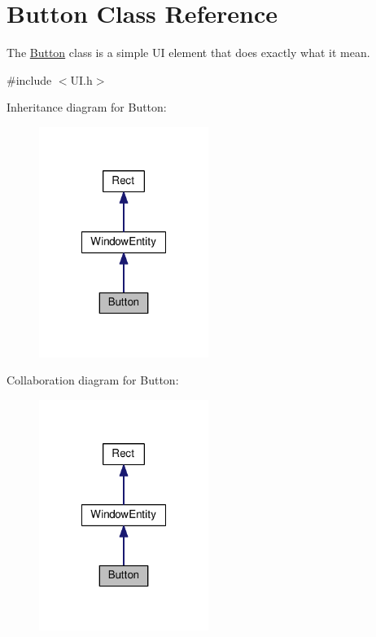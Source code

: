 \hypertarget{class_button}{\section{Button Class Reference}
\label{class_button}
}


The \hyperlink{class_button}{Button} class is a simple U\-I element that does exactly what it mean.  




{\ttfamily \#include $<$U\-I.\-h$>$}



Inheritance diagram for Button\-:\nopagebreak
\begin{figure}[H]
\begin{center}
\leavevmode
\includegraphics[width=156pt]{class_button__inherit__graph}
\end{center}
\end{figure}


Collaboration diagram for Button\-:\nopagebreak
\begin{figure}[H]
\begin{center}
\leavevmode
\includegraphics[width=156pt]{class_button__coll__graph}
\end{center}
\end{figure}
